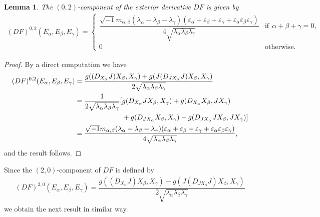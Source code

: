 \documentclass[pdftex]{sigma}%
\numberwithin{equation}{section}
\newtheorem{Lemma}[Theorem]{Lemma}
\begin{document}
\begin{Lemma}
The $(0,2)$-component of the exterior derivative $DF$ is given by
\begin{gather*}
(DF)^{0,2}(E_{\alpha},E_{\beta},E_{\gamma})=
\begin{cases}
\dfrac{\sqrt{-1} m_{\alpha,\beta}(\lambda_{\alpha}\!-\!\lambda_{\beta}\!-\!\lambda_{\gamma})(\varepsilon_{\alpha} \!+\!\varepsilon_{\beta}\!+\!\varepsilon_{\gamma}\!+\!\varepsilon_{\alpha}\varepsilon_{\beta}\varepsilon_{\gamma})} {4\sqrt{\lambda_{\alpha}\lambda_{\beta}\lambda_{\gamma}}} &\text{if}\ \ \alpha\!+\!\beta\!+\!\gamma = 0,
\\
0 &\text{otherwise.}
\end{cases}
\end{gather*}
\end{Lemma}
\begin{proof}
By a direct computation we have
\begin{align*}
(DF)^{0,2}(E_{\alpha},E_{\beta},E_{\gamma})={}&\dfrac{g((D_{X_{\alpha}}J)X_{\beta},X_{\gamma}) +g(J(D_{JX_{\alpha}}J)X_{\beta},X_{\gamma})}{2\sqrt{\lambda_{\alpha}\lambda_{\beta}\lambda_{\gamma}}}
\\
={}&\dfrac{1}{2\sqrt{\lambda_{\alpha}\lambda_{\beta}\lambda_{\gamma}}} [g(D_{X_{\alpha}}JX_{\beta},X_{\gamma})+g(D_{X_{\alpha}}X_{\beta},J X_{\gamma})
\\
&\hphantom{\dfrac{1}{2\sqrt{\lambda_{\alpha}\lambda_{\beta}\lambda_{\gamma}}} [}+g(D_{J X_{\alpha}}X_{\beta},X_{\gamma})-g(D_{J X_{\alpha}}J{X_{\beta}},J X_{\gamma})]
\\
={}&\dfrac{\sqrt{-1}m_{\alpha,\beta}(\lambda_{\alpha}-\lambda_{\beta} -\lambda_{\gamma})(\varepsilon_{\alpha} +\varepsilon_{\beta}+\varepsilon_{\gamma} +\varepsilon_{\alpha}\varepsilon_{\beta}\varepsilon_{\gamma})} {4\sqrt{\lambda_{\alpha}\lambda_{\beta}\lambda_{\gamma}}},
\end{align*}
and the result follows.
\end{proof}

Since the $(2,0)$-component of $DF$ is defined by
\begin{gather*}
(DF)^{2,0}(E_{\alpha},E_{\beta},E_{\gamma})=\dfrac{g((D_{X_{\alpha}}J)X_{\beta},X_{\gamma})-g(J(D_{JX_{\alpha}}J)X_{\beta},X_{\gamma})}{2\sqrt{\lambda_{\alpha}\lambda_{\beta}\lambda_{\gamma}}}
\end{gather*}
we obtain the next result in similar way.
\end{document}
